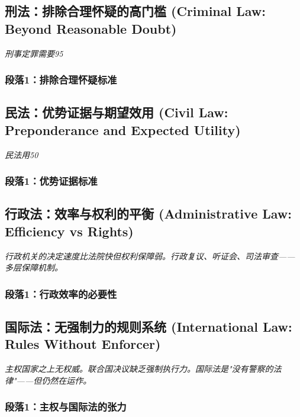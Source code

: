 \documentclass[a4paper,12pt]{book}
\newenvironment{motivation}{\begin{tcolorbox}[colback=gray!10,colframe=gray!60,title=\textit{动机}]\small\itshape}{\end{tcolorbox}}
\begin{document}
	\subsection{刑法：排除合理怀疑的高门槛 (Criminal Law: Beyond Reasonable Doubt)}
	\begin{motivation}刑事定罪需要95%
	\subsubsection*{段落1：排除合理怀疑标准}

	\subsection{民法：优势证据与期望效用 (Civil Law: Preponderance and Expected Utility)}
	\begin{motivation}民法用50%
	\subsubsection*{段落1：优势证据标准}

	\subsection{行政法：效率与权利的平衡 (Administrative Law: Efficiency vs Rights)}
	\begin{motivation}行政机关的决定速度比法院快但权利保障弱。行政复议、听证会、司法审查——多层保障机制。\end{motivation}
	\subsubsection*{段落1：行政效率的必要性}

	\subsection{国际法：无强制力的规则系统 (International Law: Rules Without Enforcer)}
	\begin{motivation}主权国家之上无权威。联合国决议缺乏强制执行力。国际法是"没有警察的法律"——但仍然在运作。\end{motivation}
	\subsubsection*{段落1：主权与国际法的张力}


\end{motivation}
\end{motivation}
\end{document}
